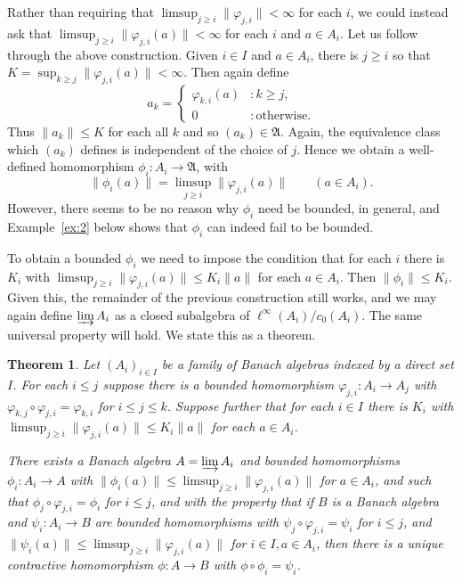 \documentclass[a4paper,11pt]{article}
\newcommand{\mf}{\mathfrak}
\newcommand{\indlim}{\varinjlim}
\newtheorem{theorem}[lemma]{Theorem}
\theoremstyle{definition}
\begin{document}
Rather than requiring that $\limsup_{j\geq i} \|\varphi_{j,i}\| < \infty$ for each $i$, we could
instead ask that $\limsup_{j\geq i} \|\varphi_{j,i}(a)\| < \infty$ for each $i$ and $a\in A_i$.
Let us follow through the above construction.  Given $i\in I$ and
$a\in A_i$, there is $j\geq i$ so that $K=\sup_{k\geq j} \|\varphi_{j,i}(a)\| < \infty$.  Then
again define
\[ a_k = \begin{cases} \varphi_{k,i}(a) &: k\geq j, \\ 0 &:\text{otherwise}. \end{cases} \]
Thus $\|a_k\| \leq K$ for each all $k$ and so $(a_k)\in\mf A$.  Again, the equivalence class which
$(a_k)$ defines is independent of the choice of $j$.  Hence we obtain a well-defined homomorphism
$\phi_i:A_i\rightarrow\mf A$, with
\[ \|\phi_i(a)\| = \limsup_{j\geq i} \|\varphi_{j,i}(a)\| \qquad (a\in A_i). \]
However, there seems to be no reason why $\phi_i$ need be bounded, in general, and
Example~\ref{ex:2} below shows that $\phi_i$ can indeed fail to be bounded.

To obtain a bounded $\phi_i$ we need to impose the condition that for each $i$ there is $K_i$ with
$\limsup_{j\geq i} \|\varphi_{j,i}(a)\| \leq K_i\|a\|$ for each $a\in A_i$.  Then $\|\phi_i\| \leq
K_i$.  Given this, the remainder of the previous construction still works, and we may again define
$\indlim A_i$ as a closed subalgebra of $\ell^\infty(A_i) / c_0(A_i)$.  The same universal property
will hold.  We state this as a theorem.

\begin{theorem}\label{thm:2}
Let $(A_i)_{i\in I}$ be a family of Banach algebras indexed by a direct set $I$.  For each
$i\leq j$ suppose there is a bounded homomorphism $\varphi_{j,i}:A_i\rightarrow A_j$ with
$\varphi_{k,j} \circ \varphi_{j,i} = \varphi_{k,i}$ for $i\leq j\leq k$.  Suppose further that for
each $i\in I$ there is $K_i$ with $\limsup_{j\geq i} \|\varphi_{j,i}(a)\| \leq K_i \|a\|$ for each
$a\in A_i$.

There exists a Banach algebra $A=\indlim A_i$ and bounded homomorphisms $\phi_i:A_i\rightarrow
A$ with $\|\phi_i(a)\| \leq \limsup_{j\geq i} \|\varphi_{j,i}(a)\|$ for $a\in A_i$, and such that
$\phi_j \circ \varphi_{j,i} = \phi_i$ for $i\leq j$,
and with the property that if $B$ is a Banach algebra and
$\psi_i:A_i\rightarrow B$ are bounded homomorphisms with $\psi_j \circ \varphi_{j,i} = \psi_i$ for
$i\leq j$, and
$\|\psi_i(a)\| \leq \limsup_{j\geq i} \|\varphi_{j,i}(a)\|$ for $i\in I, a\in A_i$, then there is
a unique contractive homomorphism $\phi:A\rightarrow B$ with $\phi\circ\phi_i = \psi_i$.
\end{theorem}
\end{document}

